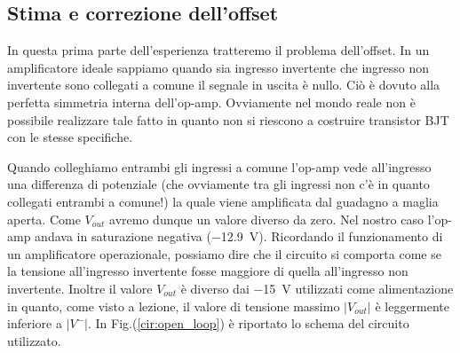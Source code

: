 


\subsection{Stima e correzione dell'offset}

In questa prima parte dell'esperienza tratteremo il problema dell'offset. In un amplificatore ideale sappiamo quando sia ingresso invertente che ingresso non invertente sono collegati a comune il segnale in uscita è nullo. Ciò è dovuto alla perfetta simmetria interna dell'op-amp. Ovviamente nel mondo reale non è possibile realizzare tale fatto in quanto non si riescono a costruire transistor BJT con le stesse specifiche. 

Quando colleghiamo entrambi gli ingressi a comune l'op-amp vede all'ingresso una differenza di potenziale (che ovviamente tra gli ingressi non c'è in quanto collegati entrambi a comune!) la quale viene amplificata dal guadagno a maglia aperta. Come $V_{out}$ avremo dunque un valore diverso da zero. Nel nostro caso l'op-amp andava in saturazione negativa (\SI{-12.9}{\volt}). Ricordando il funzionamento di un amplificatore operazionale, possiamo dire che il circuito si comporta come se la tensione all'ingresso invertente fosse maggiore di quella all'ingresso non invertente. Inoltre il valore $V_{out}$ è diverso dai \SI{-15}{\volt} utilizzati come alimentazione in quanto, come visto a lezione, il valore di tensione massimo $|V_{out}|$ è leggermente inferiore a $|V^-|$. In Fig.(\ref{cir:open_loop}) è riportato lo schema del circuito utilizzato.


